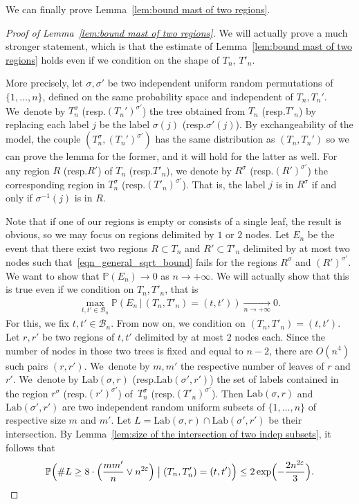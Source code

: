 \documentclass[11pt]{article}
\newcommand{\resp}{resp.\xspace}
\newcommand{\Pp}[1]{\mathbb{P} \left(#1\right)}
\newcommand{\BPpsq}[2]{\mathbb{P} \Bigl(#1\bigm|#2\Bigr)}
\let\eps\varepsilon
\theoremstyle{plain}
\theoremstyle{definition}
\numberwithin{equation}{section}
\begin{document}
We can finally prove Lemma~\ref{lem:bound mast of two regions}.
\begin{proof}[Proof of Lemma~\ref{lem:bound mast of two regions}]
We will actually prove a much stronger statement, which is that the estimate of Lemma~\ref{lem:bound mast of two regions} holds even if we condition on the shape of $T_n$, $T'_n$.

More precisely, let $\sigma,\sigma'$ be two independent uniform random permutations of $\{1,\dots,n\}$, defined on the same probability space and independent of $T_n, T_n'$. We~denote by $T_n^\sigma$ (\resp $(T_n')^{\sigma'}$) the tree obtained from $T_n$ (\resp $T'_n$) by replacing each label $j$ be the label $\sigma(j)$ (\resp $\sigma'(j)$). By exchangeability of the model, the couple $(T_n^\sigma,(T_n')^{\sigma'})$ has the same distribution as $(T_n,T_n')$ so we can prove the lemma for the former, and it will hold for the latter as well. For any region $R$ (\resp $R'$) of $T_n$ (\resp $T'_n$), we denote by $R^{\sigma}$ (\resp $(R')^{\sigma'}$) the corresponding region in $T_n^{\sigma}$ (\resp $(T'_n)^{\sigma'}$). That is, the label $j$ is in $R^{\sigma}$ if and only if $\sigma^{-1}(j)$ is in $R$.

Note that if one of our regions is empty or consists of a single leaf, the result is obvious, so we may focus on regions delimited by $1$ or $2$ nodes.
Let $E_n$ be the event that there exist two regions $R \subset T_n$ and $R' \subset T'_n$ delimited by at most two nodes such that~\eqref{eqn_general_sqrt_bound} fails for the regions $R^{\sigma}$ and $(R')^{\sigma'}$.
We want to show that $\Pp{E_n} \to 0$ as $n \to +\infty$.
We will actually show that this is true even if we condition on $T_n, T'_n$, that is
\begin{align}\label{eqn:sqrt_bound_conditioned_on_shape}
\max_{t,t' \in \mathcal{B}_n} \Pp{E_n \, | \, (T_n, T'_n)=(t,t')} \xrightarrow[n \to +\infty]{} 0.
\end{align}
For this, we fix $t,t' \in \mathcal{B}_n$.
From now on, we condition on $(T_n,T'_n)=(t,t')$.
Let $r,r'$ be two regions of $t,t'$ delimited by at most $2$ nodes each.
Since the number of nodes in those two trees is fixed and equal to $n-2$, there are $O(n^4)$ such pairs $(r,r')$.
We~denote by $m,m'$ the respective number of leaves of $r$ and $r'$.
We~denote by $\mathrm{Lab}(\sigma,r)$ (\resp $\mathrm{Lab}(\sigma',r')$) the set of labels contained in the region $r^{\sigma}$ (\resp $(r')^{\sigma'}$) of~$T_n^{\sigma}$ (\resp $(T'_n)^{\sigma'}$).
Then $\mathrm{Lab}(\sigma,r)$ and $\mathrm{Lab}(\sigma',r')$ are two independent random uniform subsets of $\{1,\dots,n\}$ of respective size $m$ and $m'$. Let $L=\mathrm{Lab}(\sigma,r)\cap \mathrm{Lab}(\sigma',r')$ be their intersection. By Lemma~\ref{lem:size of the intersection of two indep subsets}, it follows that
\begin{equation}\label{eqn:conditioned_sqrt_bound_step1}
\BPpsq{\#L \geq 8 \cdot \Bigl(\frac{m m'}{n} \vee n^{2\eps} \Bigr)}{ (T_n,T'_n)=(t,t')} \leq 2 \exp\Bigl(-\frac{2n^{2\eps}}{3}\Bigr).
\end{equation}


\end{proof}
\end{document}
